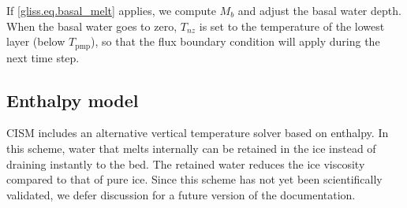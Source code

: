 If \eqref{gliss.eq.basal_melt} applies, we compute $M_b$ and adjust the basal water depth.
When the basal water goes to zero, $T_{nz}$ is set to the temperature of the lowest layer 
(below $T_{\mathrm{pmp}}$), so that the flux boundary condition will apply during the next time step.

\subsection{Enthalpy model}

CISM includes an alternative vertical temperature solver based on enthalpy. 
In this scheme, water that melts internally can be retained in the ice instead 
of draining instantly to the bed. The retained water reduces the ice viscosity 
compared to that of pure ice. Since this scheme has not yet been scientifically validated, 
we defer discussion for a future version of the documentation.




